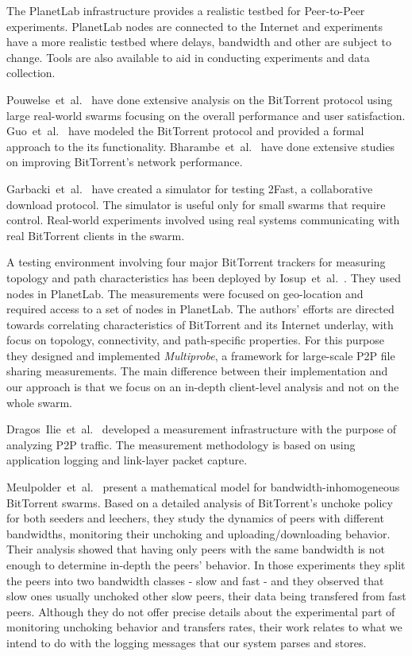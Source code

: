 The PlanetLab infrastructure provides a realistic testbed for
Peer-to-Peer experiments. PlanetLab nodes are connected to the Internet and
experiments have a more realistic testbed where delays, bandwidth and other
are subject to change. Tools are also available to aid in conducting
experiments and data collection.

Pouwelse~et~al.~\cite{measurement-study} have done extensive analysis on the
BitTorrent protocol using large real-world swarms focusing on the overall
performance and user satisfaction. Guo~et~al.~\cite{guo} have modeled the
BitTorrent protocol and provided a formal approach to the its functionality.
Bharambe~et~al.~\cite{bt-analysis} have done extensive studies on improving
BitTorrent's network performance.

Garbacki~et~al.~\cite{garbacki} have created a simulator for testing 2Fast, a
collaborative download protocol. The simulator is useful only for small swarms
that require control. Real-world experiments involved using real systems
communicating with real BitTorrent clients in the swarm.

A testing environment involving four major BitTorrent trackers for measuring
topology and path characteristics has been deployed by
Iosup~et~al.~\cite{corr-overlay}. They used nodes in PlanetLab. The
measurements were focused on geo-location and required access to a set of
nodes in PlanetLab. The authors' efforts are directed towards correlating
characteristics of BitTorrent and its Internet underlay, with focus on
topology, connectivity, and path-specific properties. For this purpose they
designed and implemented \textit{Multiprobe}, a framework for large-scale P2P
file sharing measurements. The main difference between their implementation
and our approach is that we focus on an in-depth client-level analysis and not
on the whole swarm.

Dragos~Ilie~et~al.~\cite{p2p-traf-meas} developed a measurement infrastructure
with the purpose of analyzing P2P traffic. The measurement methodology is
based on using application logging and link-layer packet capture.

Meulpolder~et~al.~\cite{p2p09} present a mathematical model for
bandwidth-inhomogeneous BitTorrent swarms. Based on a detailed analysis of
BitTorrent's unchoke policy for both seeders and leechers, they study the
dynamics of peers with different bandwidths, monitoring their unchoking and
uploading/downloading behavior. Their analysis showed that having only peers
with the same bandwidth is not enough to determine in-depth the peers'
behavior. In those experiments they split the peers into two bandwidth classes
- slow and fast - and they observed that slow ones usually unchoked other slow
peers, their data being transfered from fast peers. Although they do not offer
precise details about the experimental part of monitoring unchoking behavior
and transfers rates, their work relates to what we intend to do with the
logging messages that our system parses and stores. 

